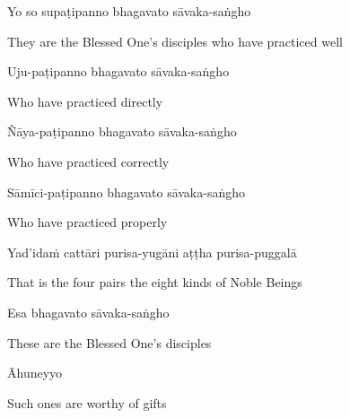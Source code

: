Yo so supaṭipanno bhagavato sāvaka-saṅgho

\begin{english}
  They are the Blessed One's disciples who have practiced well
\end{english}

Uju-paṭipanno bhagavato sāvaka-saṅgho

\begin{english}
    Who have practiced directly\makeatletter\hyperlink{endnote5-appendix}\makeatother

\end{english}

Ñāya-paṭipanno bhagavato sāvaka-saṅgho

\begin{english}
    Who have practiced correctly\makeatletter\hyperlink{endnote6-appendix}\makeatother

\end{english}

Sāmīci-paṭipanno bhagavato sāvaka-saṅgho

\begin{english}
  Who have practiced properly\makeatletter\hyperlink{endnote7-appendix}\makeatother

\end{english}

Yad'idaṁ cattāri purisa-yugāni aṭṭha purisa-puggalā

\begin{english}
  That is the four pairs the eight kinds of Noble Beings
\end{english}

Esa bhagavato sāvaka-saṅgho

\begin{english}
  These are the Blessed One's disciples
\end{english}

Āhuneyyo

\begin{english}
  Such ones are worthy of gifts
\end{english}

